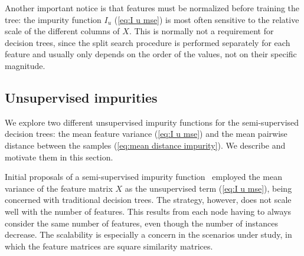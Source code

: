 Another important notice is that features must be normalized before training the tree: the impurity function $I_u$ (\autoref{eq:I u mse}) is most often sensitive to the relative scale of the different columns of $X$. This is normally not a requirement for decision trees, since the split search procedure is performed separately for each feature and usually only depends on the order of the values, not on their specific magnitude.


\subsection{Unsupervised impurities}
\label{sec:Iu}

We explore two different unsupervised impurity functions for the semi-supervised decision trees: the mean feature variance (\autoref{eq:I u mse}) and the mean pairwise distance between the samples (\autoref{eq:mean distance impurity}). We describe and motivate them in this section.

Initial proposals of a semi-supervised impurity function~\cite{levatic2017semisupervised} employed the mean variance of the feature matrix $X$ as the unsupervised term (\autoref{eq:I u mse}), being concerned with traditional decision trees.
The strategy, however, does not scale well with the number of features.
This results from each node having to always consider the same number of features, even though the number of instances decrease.
The scalability is especially a concern in the scenarios under study, in which the feature matrices are square similarity matrices.


